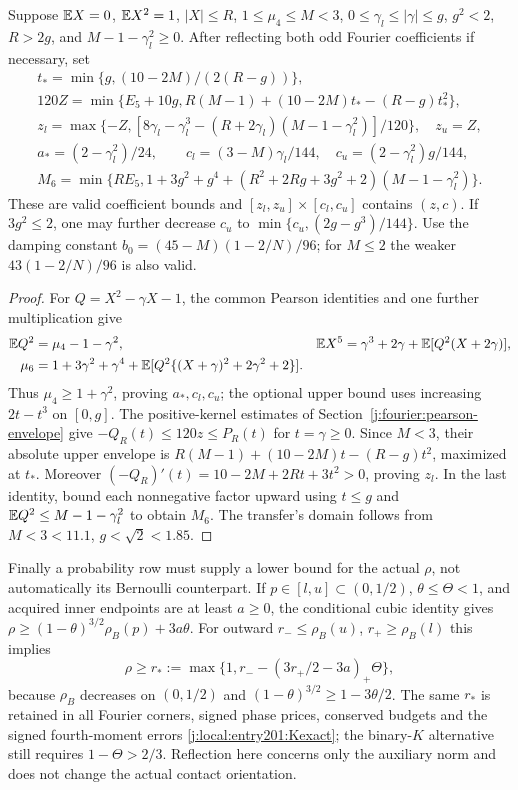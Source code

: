 \begin{proposition}
\label{j:local:paired-rectangle}
Suppose $\mathbb E X=0$, $\mathbb E X^2=1$, $|X|\le R$, $1\le\mu_4\le M<3$,
$0\le\gamma_l\le|\gamma|\le g$, $g^2<2$, $R>2g$, and
$M-1-\gamma_l^2\ge0$. After reflecting both odd Fourier coefficients
if necessary, set
\begin{gather*}
 t_* =\min\{g,(10-2M)/(2(R-g))\},\\
 120Z=\min\{E_5+10g,R(M-1)+(10-2M)t_*-(R-g)t_*^2\},\\
 z_l=\max\{-Z,[8\gamma_l-\gamma_l^3
        -(R+2\gamma_l)(M-1-\gamma_l^2)]/120\},\quad z_u=Z,\\
 a_*=(2-\gamma_l^2)/24,\qquad
 c_l=(3-M)\gamma_l/144,\quad c_u=(2-\gamma_l^2)g/144,\\
 M_6=\min\{RE_5,1+3g^2+g^4+
 (R^2+2Rg+3g^2+2)(M-1-\gamma_l^2)\}.
\end{gather*}
These are valid coefficient bounds and $[z_l,z_u]\times[c_l,c_u]$
contains $(z,c)$. If $3g^2\le2$, one may further decrease $c_u$ to
$\min\{c_u,(2g-g^3)/144\}$. Use the damping constant
$b_0=(45-M)(1-2/N)/96$; for $M\le2$ the weaker
$43(1-2/N)/96$ is also valid.
\end{proposition}
\begin{proof}
For $Q=X^2-\gamma X-1$, the common Pearson identities and one further
multiplication give
\begin{align}\label{j:local:fourier:pearson}
 \mathbb E Q^2&=\mu_4-1-\gamma^2,&
 \mathbb E X^5&=\gamma^3+2\gamma+\mathbb E[Q^2(X+2\gamma)],\notag\\
 \mu_6&=1+3\gamma^2+\gamma^4+
       \mathbb E[Q^2\{(X+\gamma)^2+2\gamma^2+2\}].
\end{align}
Thus $\mu_4\ge1+\gamma^2$, proving $a_*,c_l,c_u$; the optional
upper bound uses increasing $2t-t^3$ on $[0,g]$.
The positive-kernel estimates of Section~\ref{j:fourier:pearson-envelope}
give $-Q_R(t)\le120z\le P_R(t)$ for $t=\gamma\ge0$.
Since $M<3$, their absolute upper envelope is
$R(M-1)+(10-2M)t-(R-g)t^2$, maximized at $t_*$.
Moreover $(-Q_R)'(t)=10-2M+2Rt+3t^2>0$, proving $z_l$.
In the last identity, bound each nonnegative factor upward using
$t\le g$ and $\mathbb E Q^2\le M-1-\gamma_l^2$ to obtain $M_6$.
The transfer's domain follows from $M<3<11.1$, $g<\sqrt2<1.85$.
\end{proof}

Finally a probability row must supply a lower bound for the actual
$\rho$, not automatically its Bernoulli counterpart. If
$p\in[l,u]\subset(0,1/2)$, $\theta\le\Theta<1$, and acquired inner
endpoints are at least $a\ge0$, the conditional cubic identity gives
$\rho\ge(1-\theta)^{3/2}\rho_B(p)+3a\theta$.
For outward $r_-\le\rho_B(u)$, $r_+\ge\rho_B(l)$ this implies
\[
 \rho\ge r_*:=\max\{1,r_--(3r_+/2-3a)_+\Theta\},
\]
because $\rho_B$ decreases on $(0,1/2)$ and
$(1-\theta)^{3/2}\ge1-3\theta/2$.
The same $r_*$ is retained in all Fourier corners, signed phase prices,
conserved budgets and the signed fourth-moment errors
\eqref{j:local:entry201:Kexact}; the binary-$K$ alternative still requires
$1-\Theta>2/3$. Reflection here concerns only the auxiliary norm and
does not change the actual contact orientation.

